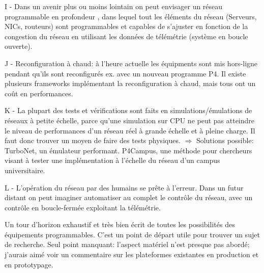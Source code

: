 I - Dans un avenir plus ou moins lointain on peut envisager un réseau \og programmable en profondeur \fg, dans lequel tout les éléments du réseau (Serveurs, NICs, routeurs) sont programmables et capables de s'ajuster en fonction de la congestion du réseau en utilisant les données de télémétrie (système en boucle ouverte).

J - Reconfiguration à chaud: à l'heure actuelle les équipments sont mis hors-ligne pendant qu'ils sont reconfigurés ex. avec un nouveau programme P4. Il existe plusieurs frameworks implémentant la reconfiguration à chaud, mais tous ont un coût en performances.

K - La plupart des tests et vérifications sont faits en simulations/émulations de réseaux à petite échelle, parce qu'une simulation sur CPU ne peut pas atteindre le niveau de performances d'un réseau réel à grande échelle et à pleine charge. Il faut donc trouver un moyen de faire des tests physiques.
$\Rightarrow$ Solutions possible: TurboNet, un émulateur performant. P4Campus, une méthode pour chercheurs visant à tester une implémentation à l'échelle du réseau d'un campus universitaire.

L - L'opération du réseau par des humains se prête à l'erreur. Dans un futur distant on peut imaginer automatiser au complet le contrôle du réseau, avec un contrôle en boucle-fermée exploitant la télémétrie.

 Un tour d'horizon exhaustif et très bien écrit de toutes les possibilités des équipements programmables. C'est un point de départ utile pour trouver un sujet de recherche. Seul point manquant: l'aspect matériel n'est presque pas abordé; j'aurais aimé voir un commentaire sur les plateformes existantes en production et en prototypage.

\clearpage
